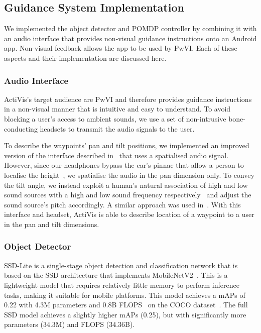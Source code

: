 \documentclass[runningheads]{llncs}
\begin{document}
\subsection{Guidance System Implementation}

We implemented the object detector and POMDP controller by combining it with an audio interface that provides non-visual guidance instructions onto an Android app.%
Non-visual feedback allows the app to be used by PwVI.
Each of these aspects and their implementation are discussed here.

\subsubsection{Audio Interface}

ActiVis's target audience are PwVI and therefore provides guidance instructions in a non-visual manner that is intuitive and easy to understand. 
To avoid blocking a user's access to ambient sounds, we use a set of non-intrusive bone-conducting headsets to transmit the audio signals to the user. 

To describe the waypoints' pan and tilt positions, we implemented an improved version of the interface described in~\cite{bellotto2013} that uses a spatialised audio signal.
However, since our headphones bypass the ear's pinnae that allow a person to localise the height~\cite{roffler1968factors}, we spatialise the audio in the pan dimension only.
To convey the tilt angle, we instead exploit a human's natural association of high and low sound sources with a high and low sound frequency respectively~\cite{blauert1997spatial} and adjust the sound source's pitch accordingly. 
A similar approach was used in~\cite{schauerte2012assistive}.
With this interface and headset, ActiVis is able to describe location of a waypoint to a user in the pan and tilt dimensions.

\subsubsection{Object Detector}

SSD-Lite is a single-stage object detection and classification network that is based on the SSD architecture that implements MobileNetV2~\cite{sandler2018mobilenetv2}.
This is a lightweight model that requires relatively little memory to perform inference tasks, making it suitable for mobile platforms. 
This model achieves a mAPs of 0.22 with 4.3M parameters and 0.8B FLOPS~\cite{li2018tinydsod} on the COCO dataset~\cite{lin2014microsoft}. 
The full SSD model achieves a slightly higher mAPs (0.25), but with significantly more parameters (34.3M) and FLOPS (34.36B).
\end{document}
